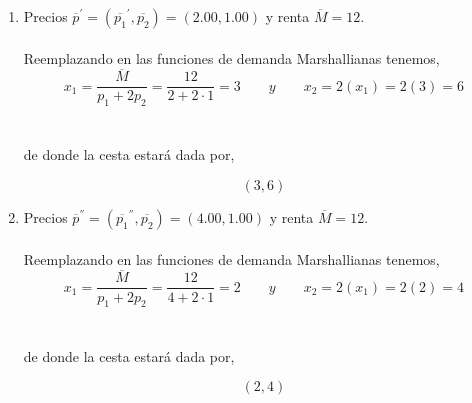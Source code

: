 \begin{enumerate}
\begin{enumerate}[\bfseries a)]
\begin{enumerate}[\bfseries b1)]
		    \item Precios $\overline{p}^{'} =  (\overline{p_1}^{'},\overline{p_2}) = (2.00,1.00)$ y renta $\overline{M} = 12$.\\\\

			Reemplazando en las funciones de demanda Marshallianas tenemos,\\
			$$x_1 = \dfrac{\overline{M}}{p_1+2p_2} = \dfrac{12}{2+2\cdot 1 } = 3 \qquad y \qquad x_2 = 2\left(x_1\right) = 2\left( 3 \right) = 6 $$\\\\
			de donde la cesta estará dada por,\\
			\begin{tcolorbox}[colframe=white]
			    $$(3,6)$$
			\end{tcolorbox}
			\vspace{1cm}

		    \item Precios $\overline{p}^{''} =  (\overline{p_1}^{''},\overline{p_2}) = (4.00,1.00)$ y renta $\overline{M} = 12$.\\\\

			Reemplazando en las funciones de demanda Marshallianas tenemos,\\
			$$x_1 = \dfrac{\overline{M}}{p_1+2p_2} = \dfrac{12}{4+2\cdot 1 } = 2 \qquad y \qquad x_2 = 2\left(x_1\right) = 2\left( 2 \right) = 4 $$\\\\
			de donde la cesta estará dada por,\\
			\begin{tcolorbox}[colframe=white]
			    $$(2,4)$$
			\end{tcolorbox}
			\vspace{1cm}

		\end{enumerate}


\end{enumerate}
\end{enumerate}

